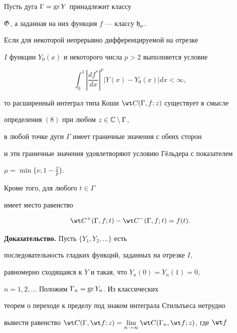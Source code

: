 \begin{thm}


Пусть дуга $\Gamma = \operatorname{gr} Y$ принадлежит классу


$\operatorname{\frak G}$, а заданная на них функция $f$ --- классу $\operatorname{\frak h}_{\nu}$.


Если для некоторой непрерывно дифференцируемой на отрезке


$I$ функции $Y_{0}(x)$ и некоторого числа $p>2$ выполняется условие


$$


\int_{0}^{1}{\left|\frac{df^*}{dx}\right|^{p}


\left|Y(x) - Y_{0}(x)\right|dx} < \infty,


$$


то расширенный интеграл типа Коши $\wt C(\Gamma, f;z)$ существует в смысле


определения $(8)$ при любом $z\in {\Bbb C}\setminus\Gamma$,


в любой точке дуги $\Gamma$ имеет граничные значения с обеих сторон


и эти граничные значения удовлетворяют условию Г\"ельдера с показателем


$\mu = \min\big\{\nu, 1-\frac{2}{p}\big\}$.


Кроме того, для любого $t\in\Gamma$


имеет место равенство


\begin{equation}


\wt C^{+}(\Gamma,f;t) - \wt C^{-}(\Gamma,f;t) = f(t).


\end{equation}


\end{thm}





{\bf Доказательство.} Пусть $\{Y_1, Y_2, \dotsc\}$ есть


последовательность гладких функций, заданных на отрезке $I$,


равномерно сходящаяся к $Y$ и такая, что $Y_{n}(0) = Y_{n}(1) = 0$,


$n = 1,2,\dotsc$ Положим $\Gamma_n = \operatorname{gr} Y_n$. Из классических


теорем о переходе к пределу под знаком интеграла Стильтьеса нетрудно


вывести равенство $\wt C(\Gamma,\wt f;z) =


\lim\limits_{n\to\infty}{\wt C(\Gamma_n, \wt f;z)}$, где $\wt f$


